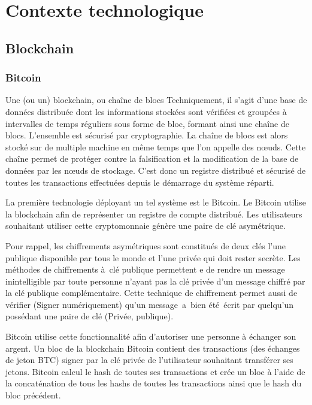 \section{Contexte technologique}

\subsection{Blockchain}

\subsubsection{Bitcoin}

Une (ou un) blockchain, ou chaîne de blocs  Techniquement, il s'agit d'une base de données distribuée dont les informations stockées sont vérifiées 
et groupées à intervalles de temps réguliers sous forme de bloc, formant ainsi une chaîne de blocs. L'ensemble est sécurisé par cryptographie. 
La chaîne de blocs est alors stocké sur de multiple machine en même temps que l'on appelle des nœuds. 
Cette chaîne permet de protéger contre la falsification et la modification de la base de données par les nœuds de stockage.
C'est donc un registre distribué et sécurisé de toutes les transactions effectuées depuis le démarrage du système réparti.

La première technologie déployant un tel système est le Bitcoin. Le Bitcoin utilise la blockchain afin de représenter un registre de compte
distribué. Les utilisateurs souhaitant utiliser cette cryptomonnaie génère une paire de clé asymétrique.

Pour rappel, les chiffrements asymétriques sont constitués de deux clés l'une publique disponible par tous le monde et l'une privée qui doit
rester secrète. Les méthodes de chiffrements à clé publique permettent e de rendre un message inintelligible par toute personne n'ayant pas la clé 
privée d'un message chiffré par la clé publique complémentaire. Cette technique de chiffrement permet aussi de vérifier (Signer numériquement) qu'un
message a bien été écrit par quelqu'un possédant une paire de clé (Privée, publique).

Bitcoin utilise cette fonctionnalité afin d'autoriser une personne à échanger son argent. Un bloc de la blockchain Bitcoin contient des transactions
(des échanges de jeton BTC) signer par la clé privée de l'utilisateur souhaitant transférer ses jetons. Bitcoin calcul le hash de toutes ses 
transactions et crée un bloc à l'aide de la concaténation de tous les hashs de toutes les transactions ainsi que le hash du bloc précédent.

